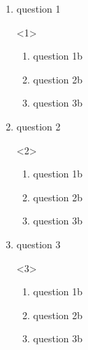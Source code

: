 \documentclass{beamer}
\begin{document}
\begin{frame}
    \begin{enumerate}
        \item question 1
        \begin{onlyenv}<1>
            \begin{enumerate}
                \item question 1b
                \item question 2b
                \item question 3b
            \end{enumerate}
        \end{onlyenv}

        \item question 2
        \begin{onlyenv}<2>
            \begin{enumerate}
                \item question 1b
                \item question 2b
                \item question 3b
            \end{enumerate}
        \end{onlyenv}

        \item question 3
        \begin{onlyenv}<3>
            \begin{enumerate}
                \item question 1b
                \item question 2b
                \item question 3b
            \end{enumerate}
        \end{onlyenv}

    \end{enumerate}
\end{frame} 
\end{document}
